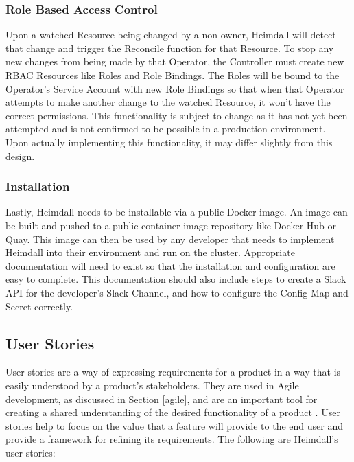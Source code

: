 \documentclass{article}
\begin{document}
\subsubsection{Role Based Access Control} \label{security}

Upon a watched Resource being changed by a non-owner, Heimdall will detect that change and trigger the Reconcile function for that Resource. To stop any new changes from being made by that Operator, the Controller must create new RBAC Resources like Roles and Role Bindings. The Roles will be bound to the Operator's Service Account with new Role Bindings so that when that Operator attempts to make another change to the watched Resource, it won't have the correct permissions. This functionality is subject to change as it has not yet been attempted and is not confirmed to be possible in a production environment. Upon actually implementing this functionality, it may differ slightly from this design.


\subsubsection{Installation}

Lastly, Heimdall needs to be installable via a public Docker image. An image can be built and pushed to a public container image repository like Docker Hub or Quay. This image can then be used by any developer that needs to implement Heimdall into their environment and run on the cluster. Appropriate documentation will need to exist so that the installation and configuration are easy to complete. This documentation should also include steps to create a Slack API for the developer's Slack Channel, and how to configure the Config Map and Secret correctly.



\subsection{User Stories}

User stories are a way of expressing requirements for a product in a way that is easily understood by a product's stakeholders. They are used in Agile development, as discussed in Section \ref{agile}, and are an important tool for creating a shared understanding of the desired functionality of a product \cite{user-stories}. User stories help to focus on the value that a feature will provide to the end user and provide a framework for refining its requirements. The following are Heimdall's user stories:
\end{document}
